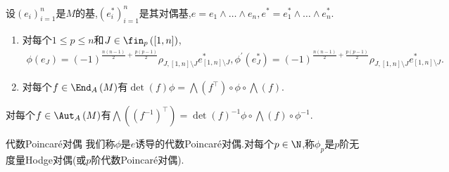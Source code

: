 \begin{proposition}{}{}
	设$\left(e_{i}\right)_{i=1}^{n}$是$M$的基,$\left(e_{i}^{\ast}\right)_{i=1}^{n}$是其对偶基,$e=e_{1}\wedge\ldots\wedge e_{n},e^{\ast}=e_{1}^{\ast}\wedge\ldots\wedge e_{n}^{\ast}$.
	\begin{enumerate}
		\item 对每个$1\leq p\leq n$和$J\in\fin_{p}\left(\left[1,n\right]\right)$,
		\begin{align*}
			\phi\left(e_{J}\right)=\left(-1\right)^{\frac{n\left(n-1\right)}{2}+\frac{p\left(p-1\right)}{2}}\rho_{J,\left[1,n\right]\setminus J}e_{\left[1,n\right]\setminus J}^{\ast},
			\phi^{\prime}\left(e_{J}^{\ast}\right)=\left(-1\right)^{\frac{n\left(n-1\right)}{2}+\frac{p\left(p-1\right)}{2}}\rho_{J,\left[1,n\right]\setminus J}e_{\left[1,n\right]\setminus J}^{\ast}.
		\end{align*}
		\item 对每个$f\in\End_{A}\left(M\right)$有$\det\left(f\right)\phi=\bigwedge\left(f^{\top}\right)\circ\phi\circ\bigwedge\left(f\right)$.
	\end{enumerate}
\end{proposition}

\begin{corollary}{}{}
	对每个$f\in\Aut_{A}\left(M\right)$有$\bigwedge\left(\left(f^{-1}\right)^{\top}\right)=\det\left(f\right)^{-1}\phi\circ\bigwedge\left(f\right)\circ\phi^{-1}$.
\end{corollary}

\begin{definition}{代数Poincar\'{e}对偶}{}
	我们称$\phi$是$e$诱导的代数Poincar\'{e}对偶.对每个$p\in\N$,称$\phi_{p}$是$p$阶无度量Hodge对偶(或$p$阶代数Poincar\'{e}对偶).
\end{definition}
























